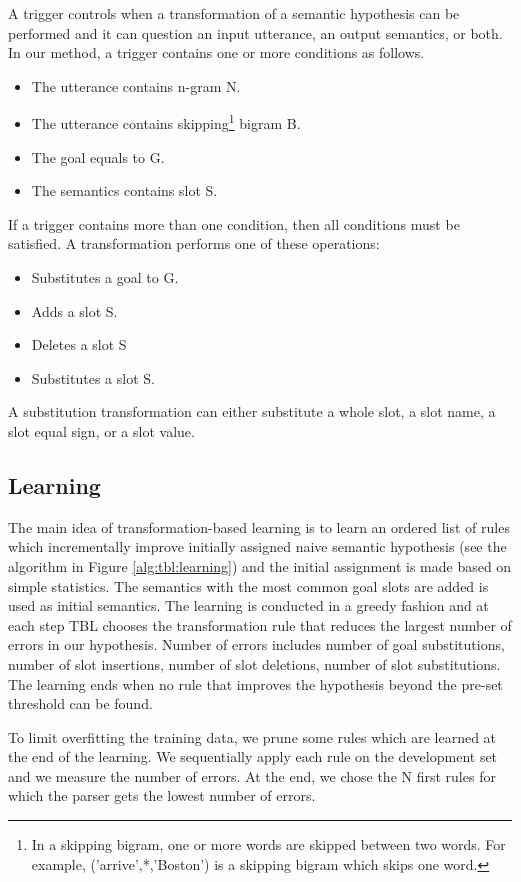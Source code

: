 \documentclass[11pt]{article}
\begin{document}
A trigger controls when a transformation of a semantic hypothesis can be performed and it can question an input utterance, an output semantics, or both. In our method, a trigger contains one or more conditions as follows.
\begin{itemize}
  \item The utterance contains n-gram N.
  \item The utterance contains skipping\footnote{In a skipping bigram, one or more words are skipped between two words. For example, ('arrive',*,'Boston') is a skipping bigram which skips one word.} bigram B.
  \item The goal equals to G.
  \item The semantics contains slot S.
\end{itemize}
If a trigger contains more than one condition, then all conditions must be satisfied. A transformation performs one of these operations:
\begin{itemize}
  \item Substitutes a goal to G.
  \item Adds a slot S.
  \item Deletes a slot S
  \item Substitutes a slot S.
\end{itemize}
A substitution transformation can either substitute a whole slot, a slot name, a slot equal sign, or a slot value.

\subsection{Learning} \label{sec:tbl:learning}
The main idea of transformation-based learning is to learn an ordered list of rules which incrementally improve initially assigned naive semantic hypothesis (see the algorithm in Figure \ref{alg:tbl:learning}) and the initial assignment is made based on simple statistics. The semantics with the most common goal slots are added is used as initial semantics. The learning is conducted in a greedy fashion and at each step TBL chooses the transformation rule that reduces the largest number of errors in our hypothesis. Number of errors includes number of goal substitutions, number of slot insertions, number of slot deletions, number of slot substitutions. The learning ends when no rule that improves the hypothesis beyond the pre-set threshold can be found.

To limit overfitting the training data, we prune some rules which are learned at the end of the learning. We sequentially apply each rule on the development set and we measure the number of errors. At the end, we chose the N first rules for which the parser gets the lowest number of errors.
\end{document}
